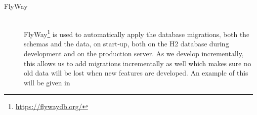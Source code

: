 \begin{description}
    \item[FlyWay] \hfill \\
        FlyWay\footnote{\url{https://flywaydb.org/}} is used to automatically apply the database migrations, both the schemas and the data, on start-up, both on the H2 database during development and on the production server.
        As we develop incrementally, this allows us to add migrations incrementally as well which makes sure no old data will be lost when new features are developed.
        An example of this will be given in 
\end{description}
